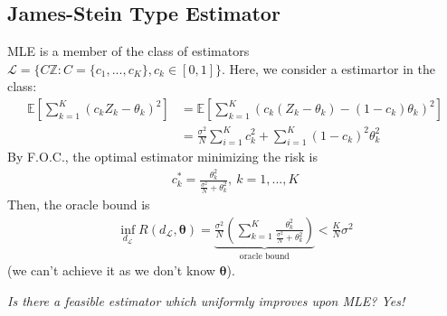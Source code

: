 \documentclass[11pt]{elegantbook}
\begin{document}
\subsection{James-Stein Type Estimator}
MLE is a member of the class of estimators $\mathcal{L}=\{C \mathbb{Z}:C=\{c_1,...,c_K\},c_k\in[0,1]\}$. Here, we consider a estimartor in the class:
\begin{equation}
    \begin{aligned}
        \mathbb{E}\left[\sum_{k=1}^K\left(c_kZ_k-\theta_k\right)^2\right]&=\mathbb{E}\left[\sum_{k=1}^K\left(c_k(Z_k-\theta_k)-(1-c_k)\theta_k\right)^2\right]\\
        &=\frac{\sigma^2}{N}\sum_{i=1}^K c_k^2+\sum_{i=1}^K(1-c_k)^2\theta_k^2
    \end{aligned}
    \nonumber
\end{equation}
By F.O.C., the optimal estimator minimizing the risk is
\begin{equation}
    \begin{aligned}
        c^*_k=\frac{\theta_k^2}{\frac{\sigma^2}{N}+\theta_k^2},\ k=1,...,K
    \end{aligned}
    \nonumber
\end{equation}
Then, the oracle bound is
\begin{equation}
    \begin{aligned}
        \inf_{d_\mathcal{L}}R(d_\mathcal{L},\boldsymbol{\theta})=\underbrace{\frac{\sigma^2}{N}\left(\sum_{k=1}^K\frac{\theta_k^2}{\frac{\sigma^2}{N}+\theta_k^2}\right)}_{\text{oracle bound}}<\frac{K}{N}\sigma^2
    \end{aligned}
    \nonumber
\end{equation}
(we can't achieve it as we don't know $\boldsymbol{\theta}$).

\textit{Is there a feasible estimator which uniformly improves upon MLE? Yes!}
\end{document}
